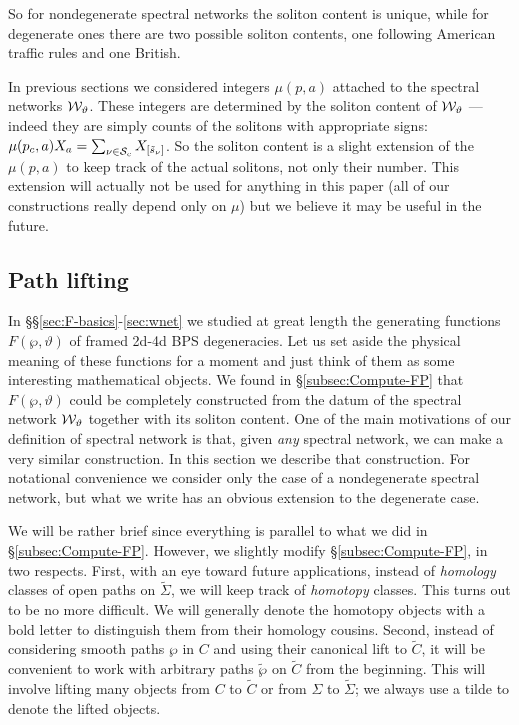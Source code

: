 \documentclass[11pt,a4paper]{article}
\def\twp{\tilde\wp}
\def\wnet {{\cal W}}
\def\CS {{\cal S}}
\newcommand{\ti}[1]{\textit{#1}}
\def\wnet {{\cal W}}
\def\CS {{\cal S}}
\begin{document}
So for nondegenerate spectral networks the soliton content
is unique, while for degenerate ones there are two possible soliton contents,
one following American traffic rules and one British.

In previous sections we considered integers
$\mu(p,a)$ attached to the spectral networks $\wnet_\vartheta$.  These integers are determined
by the soliton content of $\wnet_\vartheta$ --- indeed they are simply
counts of the solitons with appropriate signs:  $\mu(p_c, a) X_a = \sum_{\nu \in \CS_c} X_{[\tilde s_\nu]}$.
So the soliton content is a slight extension of the $\mu(p,a)$ to keep track of the actual solitons,
not only their number.  This extension will actually not be used for anything in this paper (all
of our constructions really depend only on $\mu$)
but we believe it may be useful in the future.


\subsection{Path lifting}\label{subsec:Path-Lifting}

In \S\S\ref{sec:F-basics}-\ref{sec:wnet}
we studied at great length the generating functions $F(\wp, \vartheta)$ of
framed 2d-4d BPS degeneracies.
Let us set aside the physical meaning of these functions for a moment and just
think of them as some interesting mathematical objects.
We found in \S\ref{subsec:Compute-FP} that $F(\wp, \vartheta)$ could
be completely constructed from the datum of the spectral network $\wnet_\vartheta$
together with its soliton content.
One of the main motivations of our definition of spectral network is that,
given \ti{any} spectral network, we can make a very similar construction.
In this section we describe that construction.  For notational convenience we
consider only the case of a nondegenerate spectral network, but what we write
has an obvious extension to the degenerate case.

We will be rather brief since
everything is parallel to what we did in \S\ref{subsec:Compute-FP}.
However, we slightly modify
\S\ref{subsec:Compute-FP}, in two respects.  First,
with an eye toward future applications,
instead of \ti{homology} classes of open paths
on $\tilde\Sigma$, we will keep track of \ti{homotopy} classes.
This turns out to be no more difficult.
We will generally denote the homotopy objects with a bold letter to distinguish
them from their homology cousins.  Second, instead of considering smooth paths $\wp$ in $C$
and using their canonical lift to $\tilde C$, it will be convenient to
work with arbitrary paths $\twp$ on $\tilde C$ from the beginning.
This will involve lifting many objects from $C$ to $\tilde C$ or from $\Sigma$
to $\tilde \Sigma$; we always use a tilde
to denote the lifted objects.
\end{document}
